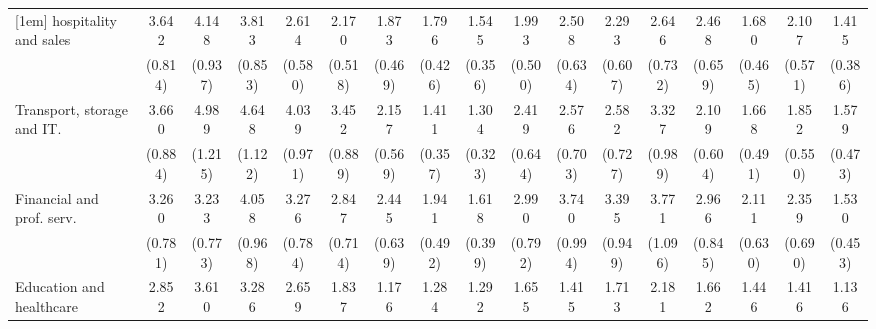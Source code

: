 {\begin{tabular}{l*{16}{c}}
[1em]
hospitality and sales&       3.642\sym{***}&       4.148\sym{***}&       3.813\sym{***}&       2.614\sym{***}&       2.170\sym{**} &       1.873\sym{*}  &       1.796\sym{*}  &       1.545         &       1.993\sym{**} &       2.508\sym{***}&       2.293\sym{**} &       2.646\sym{***}&       2.468\sym{***}&       1.680         &       2.107\sym{**} &       1.415         \\
                    &     (0.814)         &     (0.937)         &     (0.853)         &     (0.580)         &     (0.518)         &     (0.469)         &     (0.426)         &     (0.356)         &     (0.500)         &     (0.634)         &     (0.607)         &     (0.732)         &     (0.659)         &     (0.465)         &     (0.571)         &     (0.386)         \\
[1em]
Transport, storage and IT.&       3.660\sym{***}&       4.989\sym{***}&       4.648\sym{***}&       4.039\sym{***}&       3.452\sym{***}&       2.157\sym{**} &       1.411         &       1.304         &       2.419\sym{***}&       2.576\sym{***}&       2.582\sym{***}&       3.327\sym{***}&       2.109\sym{**} &       1.668         &       1.852\sym{*}  &       1.579         \\
                    &     (0.884)         &     (1.215)         &     (1.122)         &     (0.971)         &     (0.889)         &     (0.569)         &     (0.357)         &     (0.323)         &     (0.644)         &     (0.703)         &     (0.727)         &     (0.989)         &     (0.604)         &     (0.491)         &     (0.550)         &     (0.473)         \\
[1em]
Financial and prof. serv.&       3.260\sym{***}&       3.233\sym{***}&       4.058\sym{***}&       3.276\sym{***}&       2.847\sym{***}&       2.445\sym{***}&       1.941\sym{**} &       1.618         &       2.990\sym{***}&       3.740\sym{***}&       3.395\sym{***}&       3.771\sym{***}&       2.966\sym{***}&       2.111\sym{*}  &       2.359\sym{**} &       1.530         \\
                    &     (0.781)         &     (0.773)         &     (0.968)         &     (0.784)         &     (0.714)         &     (0.639)         &     (0.492)         &     (0.399)         &     (0.792)         &     (0.994)         &     (0.949)         &     (1.096)         &     (0.845)         &     (0.630)         &     (0.690)         &     (0.453)         \\
[1em]
Education and healthcare&       2.852\sym{***}&       3.610\sym{***}&       3.286\sym{***}&       2.659\sym{***}&       1.837\sym{*}  &       1.176         &       1.284         &       1.292         &       1.655         &       1.415         &       1.713         &       2.181\sym{*}  &       1.662         &       1.446         &       1.416         &       1.136         \\

\end{tabular}}
